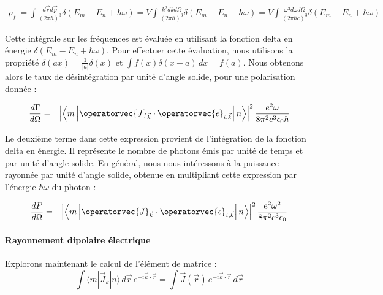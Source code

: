 \begin{eqnarray}
	\rho_f^+ = \int \frac{d \vec{r} d \vec{p}}{ ( 2 \pi \hbar )^3} \delta(E_m - E_n + \hbar\omega) = V \int \frac{ k^2 d k d \Omega }{ ( 2 \pi \hbar )^3} \delta(E_m - E_n + \hbar\omega) = V \int \frac{ \omega^2 d \omega d \Omega }{ ( 2 \pi \hbar  c)^3} \delta(E_m - E_n + \hbar\omega)
\end{eqnarray}

Cette intégrale sur les fréquences est évaluée en utilisant la fonction delta en énergie $\delta(E_m - E_n + \hbar\omega)$. Pour effectuer cette évaluation, nous utilisons la propriété $\delta(ax) = \frac{1}{|a|} \delta(x)$ et $\int f(x) \delta(x - a) \, dx = f(a)$. Nous obtenons alors le taux de désintégration par unité d'angle solide, pour une polarisation donnée :

\begin{eqnarray}
\frac{d\Gamma}{d\Omega} & = &  \left | \left \langle m \left |\operatorvec{J}_{\vec{k}} \cdot \operatorvec{\epsilon}_{i , \vec{k}}  \right |n \right \rangle \right |^2 \frac{e^2 \omega}{8 \pi^2 c^3 \epsilon_0  \hbar}
\end{eqnarray}

Le deuxième terme dans cette expression provient de l'intégration de la fonction delta en énergie. Il représente le nombre de photons émis par unité de temps et par unité d'angle solide. En général, nous nous intéressons à la puissance rayonnée par unité d'angle solide, obtenue en multipliant cette expression par l'énergie $\hbar\omega$ du photon :

\begin{eqnarray}
\frac{d P }{d\Omega} & = &  \left | \left \langle m \left |\operatorvec{J}_{\vec{k}} \cdot \operatorvec{\epsilon}_{i , \vec{k}}  \right |n \right \rangle \right |^2 \frac{e^2 \omega^2}{8 \pi^2 c^3 \epsilon_0  }
\end{eqnarray}

\paragraph{Rayonnement dipolaire électrique}

Explorons maintenant le calcul de l'élément de matrice :
\begin{equation}
\int \langle m|\vec{J}_k|n\rangle \, d\vec{r} \, e^{-i\vec{k}\cdot\vec{r}} = \int \vec{J}(\vec{r}) \, e^{-i\vec{k}\cdot\vec{r}} \, d\vec{r} \label{eq:element_matrix}
\end{equation}

